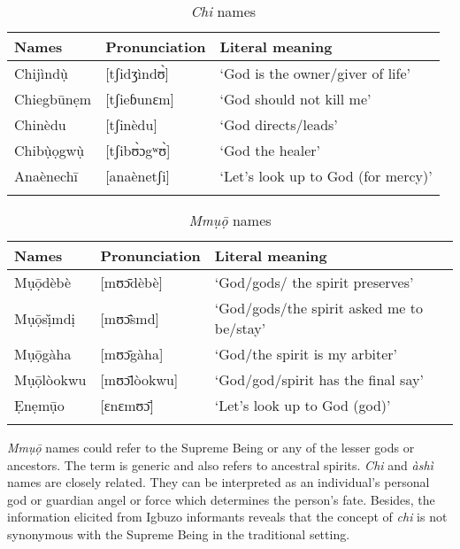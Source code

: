 \documentclass[output=paper]{langscibook}
\begin{document}
\vfill
\begin{table}[H]
\caption{\label{tab:owaleke:3.1} \textit{Chi} names}
\begin{tabularx}{\textwidth}{llQ}
\lsptoprule
Names          & Pronunciation      & Literal meaning                    \\
\midrule
Chijìndụ̀    & {[}tʃidʒìndʊ̀{]}  & ‘God is the owner/giver of life’   \\
Chiegbūnẹm   & {[}tʃieɓunɛm{]}    & ‘God should not kill me’           \\
Chinèdu       & {[}tʃinèdu{]}     & ‘God directs/leads’                \\
Chibụ̀ọgwụ̀ & {[}tʃibʊ̀ɔgʷʊ̀{]}  & ‘God the healer’                   \\
Anaènechī    & {[}anaènetʃi{]} & ‘Let’s look up to God (for mercy)’ \\
\lspbottomrule
\end{tabularx}
\end{table}
\vfill
\begin{table}[H]
\caption{\label{tab:owaleke:3.2} \textit{Mmụọ̄} names}
\begin{tabularx}{\textwidth}{llQ}  
\lsptoprule
Names          & Pronunciation      & Literal meaning            \\
\midrule
Mụọ̄dèbè   & {[}mʊɔ̄dèbè{]}  & ‘God/gods/ the spirit preserves’          \\
Mụọ̄sị̀mdị & {[}mʊɔ̄s̀md{]}  & ‘God/gods/the spirit asked me to be/stay’ \\
Mụọ̄gàha    & {[}mʊɔ̄gàha{]}   & ‘God/the spirit is my arbiter’            \\
Mụọ̄lòokwu  & {[}mʊɔ̄lòokwu{]} & ‘God/god/spirit has the final say’        \\
Ẹnẹmụ̄o     & {[}ɛnɛmʊɔ̄{]}     & ‘Let’s look up to God (god)’              \\
\lspbottomrule
\end{tabularx}
\end{table}
\vfill\pagebreak


\textit{Mmụọ̄} names could refer to the Supreme Being or any of the lesser gods or ancestors. The term is generic and also refers to ancestral spirits. \textit{Chi} and \textit{àshì} names are closely related. They can be interpreted as an individual’s personal god or guardian angel or force which determines the person’s fate. Besides, the information elicited from Igbuzo informants reveals that the concept of \textit{chi} is not synonymous with the Supreme Being in the traditional setting. 
\end{document}
